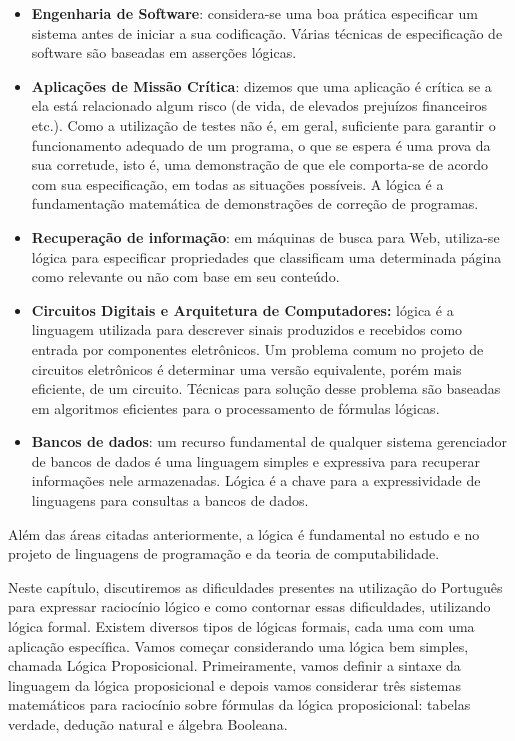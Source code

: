 \begin{itemize}
  \item \textbf{Engenharia de Software}: considera-se uma boa pr\'atica especificar um sistema antes
        de iniciar a sua codifica\c{c}\~ao. V\'arias t\'ecnicas de especifica\c{c}\~ao de software são baseadas em asserções l\'ogicas.
  \item \textbf{Aplica\c{c}\~oes de Miss\~ao Cr\'itica}: dizemos que uma aplica\c{c}\~ao \'e cr\'itica se a ela est\'a relacionado algum risco (de vida, de elevados preju\'izos financeiros etc.).
        Como a utiliza\c{c}\~ao de testes não é, em geral, suficiente para garantir o funcionamento adequado de um programa, o que se espera \'e uma prova da sua corretude, isto \'e, uma
        demonstra\c{c}\~ao de que ele comporta-se de acordo com sua especifica\c{c}\~ao, em todas as
        situa\c{c}\~oes poss\'iveis. A l\'ogica \'e a fundamenta\c{c}\~ao matem\'atica de demonstra\c{c}\~oes de corre\c{c}\~ao de programas.
   \item \textbf{Recupera\c{c}\~ao de informa\c{c}\~ao}: em m\'aquinas de busca para Web, utiliza-se l\'ogica para
         especificar propriedades que classificam uma determinada p\'agina como relevante ou n\~ao com base
         em seu conte\'udo.
   \item \textbf{Circuitos Digitais e Arquitetura de Computadores:} l\'ogica \'e a linguagem utilizada para descrever
         sinais produzidos e recebidos como entrada por componentes eletr\^onicos. Um problema comum no projeto de
         circuitos eletr\^onicos \'e determinar uma vers\~ao equivalente, por\'em mais eficiente, de um circuito.
         T\'ecnicas para solu\c{c}\~ao desse problema s\~ao baseadas em algoritmos eficientes para o processamento de
         f\'ormulas l\'ogicas.
   \item \textbf{Bancos de dados}: um recurso fundamental de qualquer sistema gerenciador de bancos de dados \'e uma linguagem
         simples e expressiva para recuperar informa\c{c}\~oes nele armazenadas. L\'ogica \'e a chave para a expressividade de linguagens para consultas a bancos de dados.
\end{itemize}

Al\'em das \'areas citadas anteriormente, a l\'ogica \'e fundamental no estudo e no projeto de linguagens de programa\c{c}\~ao
e da teoria de computabilidade.

Neste cap\'itulo, discutiremos as dificuldades presentes na utiliza\c{c}\~ao do Portugu\^es para expressar racioc\'inio
l\'ogico e como contornar essas dificuldades, utilizando l\'ogica formal. Existem diversos tipos de l\'ogicas formais, cada uma com
uma aplica\c{c}\~ao espec\'ifica. Vamos começar considerando uma l\'ogica bem simples, chamada L\'ogica Proposicional.
Primeiramente, vamos definir a sintaxe da linguagem da l\'ogica proposicional e depois vamos considerar tr\^es sistemas
matem\'aticos para racioc\'inio sobre f\'ormulas da l\'ogica proposicional: tabelas verdade, dedu\c{c}\~ao natural e \'algebra
Booleana.

